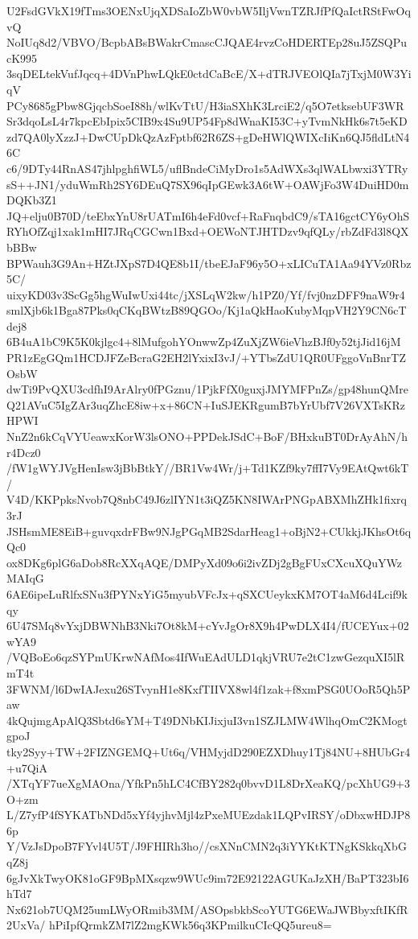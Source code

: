U2FsdGVkX19fTms3OENxUjqXDSaIoZbW0vbW5IljVwnTZRJfPfQaIctRStFwOqvQ
NoIUq8d2/VBVO/BcpbABsBWakrCmascCJQAE4rvzCoHDERTEp28uJ5ZSQPucK995
3sqDELtekVufJqcq+4DVnPhwLQkE0ctdCaBcE/X+dTRJVEOlQIa7jTxjM0W3YiqV
PCy8685gPbw8GjqcbSoeI88h/wlKvTtU/H3iaSXhK3LrciE2/q5O7etksebUF3WR
Sr3dqoLsL4r7kpcEbIpix5CIB9x4Su9UP54Fp8dWnaKI53C+yTvmNkHk6s7t5eKD
zd7QA0lyXzzJ+DwCUpDkQzAzFptbf62R6ZS+gDeHWlQWIXcIiKn6QJ5fldLtN46C
c6/9DTy44RnAS47jhlpghfiWL5/uflBndeCiMyDro1s5AdWXs3qlWALbwxi3YTRy
sS++JN1/yduWmRh2SY6DEuQ7SX96qIpGEwk3A6tW+OAWjFo3W4DuiHD0mDQKb3Z1
JQ+elju0B70D/teEbxYnU8rUATmI6h4eFd0vcf+RaFnqbdC9/sTA16gctCY6yOhS
RYhOfZqj1xak1mHI7JRqCGCwn1Bxd+OEWoNTJHTDzv9qfQLy/rbZdFd3l8QXbBBw
BPWauh3G9An+HZtJXpS7D4QE8b1I/tbeEJaF96y5O+xLICuTA1Aa94YVz0Rbz5C/
uixyKD03v3ScGg5hgWuIwUxi44tc/jXSLqW2kw/h1PZ0/Yf/fvj0nzDFF9naW9r4
smlXjb6k1Bga87Pks0qCKqBWtzB89QGOo/Kj1aQkHaoKubyMqpVH2Y9CN6cTdej8
6B4uA1bC9K5K0kjlgc4+8lMufgohYOnwwZp4ZuXjZW6ieVhzBJf0y52tjJid16jM
PR1zEgGQm1HCDJFZeBcraG2EH2lYxixI3vJ/+YTbsZdU1QR0UFggoVnBnrTZOsbW
dwTi9PvQXU3cdfhI9ArAlry0fPGznu/1PjkFfX0guxjJMYMFPnZs/gp48hunQMre
Q21AVuC5IgZAr3uqZhcE8iw+x+86CN+IuSJEKRgumB7bYrUbf7V26VXTsKRzHPWI
NnZ2n6kCqVYUeawxKorW3lsONO+PPDekJSdC+BoF/BHxkuBT0DrAyAhN/hr4Dcz0
/fW1gWYJVgHenIsw3jBbBtkY//BR1Vw4Wr/j+Td1KZf9ky7ffI7Vy9EAtQwt6kT/
V4D/KKPpksNvob7Q8nbC49J6zlIYN1t3iQZ5KN8IWArPNGpABXMhZHk1fixrq3rJ
JSHsmME8EiB+guvqxdrFBw9NJgPGqMB2SdarHeag1+oBjN2+CUkkjJKhsOt6qQc0
ox8DKg6plG6aDob8RcXXqAQE/DMPyXd09o6i2ivZDj2gBgFUxCXcuXQuYWzMAIqG
6AE6ipeLuRlfxSNu3fPYNxYiG5myubVFcJx+qSXCUeykxKM7OT4aM6d4Lcif9kqy
6U47SMq8vYxjDBWNhB3Nki7Ot8kM+cYvJgOr8X9h4PwDLX4I4/fUCEYux+02wYA9
/VQBoEo6qzSYPmUKrwNAfMos4IfWuEAdULD1qkjVRU7e2tC1zwGezquXI5lRmT4t
3FWNM/l6DwIAJexu26STvynH1e8KxfTIIVX8wl4f1zak+f8xmPSG0UOoR5Qh5Paw
4kQujmgApAlQ3Sbtd6sYM+T49DNbKIJixjuI3vn1SZJLMW4WlhqOmC2KMogtgpoJ
tky2Syy+TW+2FIZNGEMQ+Ut6q/VHMyjdD290EZXDhuy1Tj84NU+8HUbGr4+u7QiA
/XTqYF7ueXgMAOna/YfkPn5hLC4CfBY282q0bvvD1L8DrXeaKQ/pcXhUG9+3O+zm
L/Z7yfP4fSYKATbNDd5xYf4yjhvMjl4zPxeMUEzdak1LQPvIRSY/oDbxwHDJP86p
Y/VzJsDpoB7FYvl4U5T/J9FHIRh3ho//csXNnCMN2q3iYYKtKTNgKSkkqXbGqZ8j
6gJvXkTwyOK81oGF9BpMXsqzw9WUc9im72E92122AGUKaJzXH/BaPT323bI6hTd7
Nx621ob7UQM25umLWyORmib3MM/ASOpsbkbScoYUTG6EWaJWBbyxftIKfR2UxVa/
hPiIpfQrmkZM7lZ2mgKWk56q3KPmilkuCIcQQ5ureu8=
